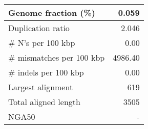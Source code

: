 \documentclass[12pt,a4paper]{article}
\begin{document}
\begin{table}[ht]
\begin{center}
\begin{tabular}{|l*{1}{|r}|}
Genome fraction (\%) & 0.059 \\ \hline
Duplication ratio & 2.046 \\ \hline
\# N's per 100 kbp & 0.00 \\ \hline
\# mismatches per 100 kbp & 4986.40 \\ \hline
\# indels per 100 kbp & 0.00 \\ \hline
Largest alignment & 619 \\ \hline
Total aligned length & 3505 \\ \hline
NGA50 & - \\ \hline
\end{tabular}
\end{center}
\end{table}
\end{document}
